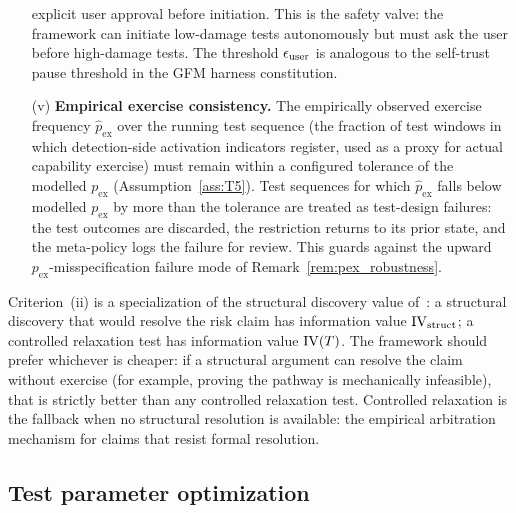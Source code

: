 \begin{definition}
\begin{itemize}
  explicit user approval before initiation.  This is the safety
  valve: the framework can initiate low-damage tests
  autonomously but must ask the user before high-damage tests.
  The threshold $\damagebound_{\mathrm{user}}$ is analogous to
  the self-trust pause threshold in the GFM harness
  constitution.
\item[(v)] \textbf{Empirical exercise consistency.}  The
  empirically observed exercise frequency $\hat{p}_{\mathrm{ex}}$
  over the running test sequence (the fraction of test windows
  in which detection-side activation indicators register, used
  as a proxy for actual capability exercise) must remain within a
  configured tolerance of the modelled $p_{\mathrm{ex}}$
  (Assumption~\ref{ass:T5}).  Test sequences for which
  $\hat{p}_{\mathrm{ex}}$ falls below modelled $p_{\mathrm{ex}}$
  by more than the tolerance are treated as test-design
  failures: the test outcomes are discarded, the restriction
  returns to its prior state, and the meta-policy logs the
  failure for review.  This guards against the upward
  $p_{\mathrm{ex}}$-misspecification failure mode of
  Remark~\ref{rem:pex_robustness}.
\end{itemize}
\end{definition}

\begin{remark}
\label{rem:structural_preference}
Criterion~(ii) is a specialization of the structural discovery
value of~\citep[Definition~5,
Proposition~2]{lasser2026horizon}: a structural discovery that
would resolve the risk claim has information value
$\mathrm{IV}_{\mathrm{struct}}$; a controlled relaxation test has
information value $\mathrm{IV}(T)$.  The framework should prefer
whichever is cheaper: if a structural argument can resolve the
claim without exercise (for example, proving the pathway is
mechanically infeasible), that is strictly better than any
controlled relaxation test.  Controlled relaxation is the
fallback when no structural resolution is available: the
empirical arbitration mechanism for claims that resist formal
resolution.
\end{remark}

\subsection{Test parameter optimization}

